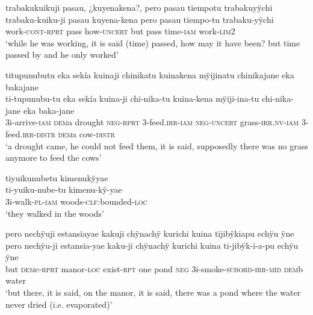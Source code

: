 \newpage
\ea%
\begingl 
\glpreamble trabakukuikuji pasau, ¿kuyenakena?, pero pasau tiempotu trabakuyÿchi\\
\gla trabaku-kuiku-ji pasau kuyena-kena pero pasau tiempo-tu trabaku-yÿchi\\ 
\glb work-\textsc{cont}-\textsc{rprt} pass how-\textsc{uncert} but pass time-\textsc{iam} work-\textsc{lim}2\\ 
\glft ‘while he was working, it is said (time) passed, how may it have been? but time passed by and he only worked’ \\ 
\endgl
\xe

\ea%
\begingl 
\glpreamble titupunubutu eka sekía kuinaji chinikatu kuinakena mÿijinatu chinikajane eka bakajane\\
\gla ti-tupunubu-tu eka sekía kuina-ji chi-nika-tu kuina-kena mÿiji-ina-tu chi-nika-jane eka baka-jane \\ 
\glb 3i-arrive-\textsc{iam} \textsc{dem}a drought \textsc{neg}-\textsc{rprt} 3-feed.\textsc{irr}-\textsc{iam} \textsc{neg}-\textsc{uncert} grass-\textsc{irr.nv}-\textsc{iam} 3-feed.\textsc{irr}-\textsc{distr} \textsc{dem}a cow-\textsc{distr}\\ 
\glft ‘a drought came, he could not feed them, it is said, supposedly there was no grass anymore to feed the cows’\\ 
\endgl
\xe

\ea%
\begingl 
\glpreamble tiyuikunubetu kimenukÿyae\\
\gla ti-yuiku-nube-tu kimenu-kÿ-yae\\ 
\glb 3i-walk-\textsc{pl}-\textsc{iam} woods-\textsc{clf:}bounded-\textsc{loc}\\ 
\glft ‘they walked in the woods’\\ 
\endgl
\xe

\ea%
\begingl 
\glpreamble pero nechÿuji estansiayae kakuji chÿnachÿ kurichi kuina tijibÿkiapu echÿu ÿne\\
\gla pero nechÿu-ji estansia-yae kaku-ji chÿnachÿ kurichi kuina ti-jibÿk-i-a-pu echÿu ÿne\\ 
\glb but \textsc{dem}c-\textsc{rprt} manor-\textsc{loc} exist-\textsc{rpt} one pond \textsc{neg} 3i-smoke-\textsc{subord}-\textsc{irr}-\textsc{mid} \textsc{dem}b water\\ 
\glft ‘but there, it is said, on the manor, it is said, there was a pond where the water never dried (i.e. evaporated)’\\ 
\endgl
\xe

